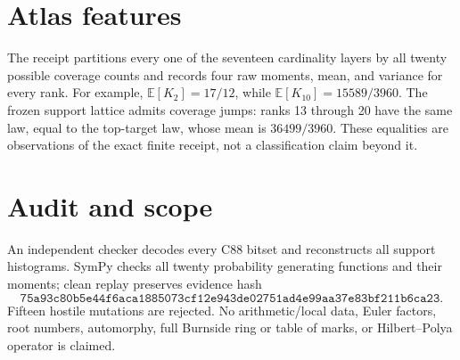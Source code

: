 \documentclass[10pt]{article}
\begin{document}
\section{Atlas features}
The receipt partitions every one of the seventeen cardinality layers by all
twenty possible coverage counts and records four raw moments, mean, and
variance for every rank.  For example,
$\mathbb E[K_2]=17/12$, while
$\mathbb E[K_{10}]=15589/3960$.  The frozen support lattice admits coverage
jumps: ranks 13 through 20 have the same law, equal to the top-target law,
whose mean is $36499/3960$.  These equalities are observations of the exact
finite receipt, not a classification claim beyond it.

\section{Audit and scope}
An independent checker decodes every C88 bitset and reconstructs all support
histograms.  SymPy checks all twenty probability generating functions and
their moments; clean replay preserves evidence hash
\[
\texttt{75a93c80b5e44f6aca1885073cf12e943de02751ad4e99aa37e83bf211b6ca23}.
\]
Fifteen hostile mutations are rejected.  No arithmetic/local data, Euler
factors, root numbers, automorphy, full Burnside ring or table of marks, or
Hilbert--Polya operator is claimed.
\end{document}

